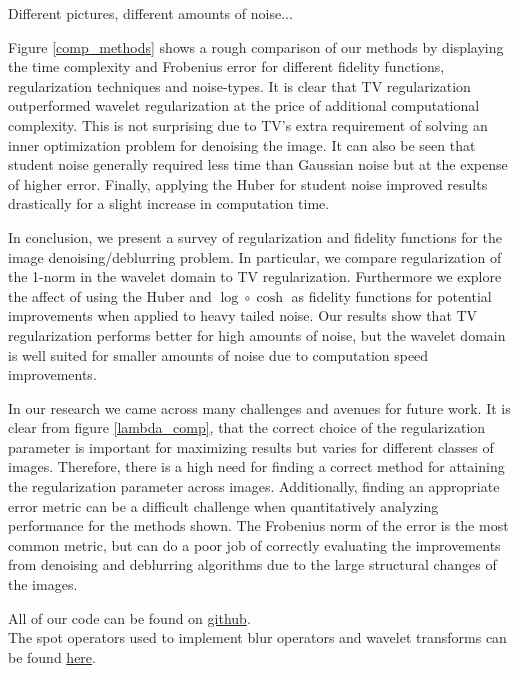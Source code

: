 \documentclass[10pt,a4paper]{article}
\begin{document}
  	
	Different pictures, different amounts of noise...
		
	Figure \ref{comp_methods} shows a rough comparison of our methods by displaying the time complexity and Frobenius error for different fidelity functions, regularization techniques and noise-types. It is clear that TV regularization outperformed wavelet regularization at the price of additional computational complexity. This is not surprising due to TV's extra requirement of solving an inner optimization problem for denoising the image. It can also be seen that student noise generally required less time than Gaussian noise but at the expense of higher error. Finally, applying the Huber for student noise improved results drastically for a slight increase in computation time.  
	
	In conclusion, we present a survey of regularization and fidelity functions for the image denoising/deblurring problem. In particular, we compare regularization of the 1-norm in the wavelet domain to TV regularization. Furthermore we explore the affect of using the Huber and $\log \circ \cosh$  as fidelity functions for potential improvements when applied to heavy tailed noise. Our results show that TV regularization performs better for high amounts of noise, but the wavelet domain is well suited for smaller amounts of noise due to computation speed improvements. 
	
	In our research we came across many challenges and avenues for future work. It is clear from figure \ref{lambda_comp}, that the correct choice of the regularization parameter is important for maximizing results but varies for different classes of images. Therefore, there is a high need for finding a correct method for attaining the regularization parameter across images. Additionally, finding an appropriate error metric can be a difficult challenge when quantitatively analyzing performance for the methods shown. The Frobenius norm of the error is the most common metric, but can do a poor job of correctly evaluating the improvements from denoising and deblurring algorithms due to the large structural changes of the images. 
	
	
	
	
	All of our code can be found on {\color{blue}\href{https://github.com/rpm4real/de_noise-blur}{github}}. \\
	The spot operators used to implement blur operators and wavelet transforms can be found {\color{blue}\href{http://www.cs.ubc.ca/labs/scl/spot/}{here}}.
	
\end{document}
